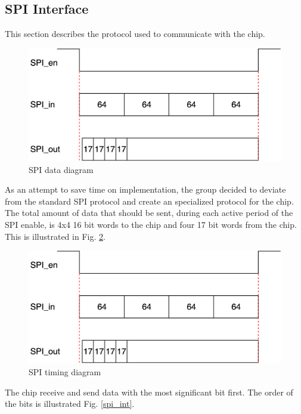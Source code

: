 
 \newpage
\subsection{SPI Interface}
This section describes the protocol used to communicate with the chip.

\begin{figure}[H]
\centering
\captionsetup{justification=centering}
\includegraphics[scale=0.35]{../figures/spi_data.png}
\caption{SPI data diagram}
\label{data}
\end{figure}

As an attempt to save time on implementation, the group decided to deviate from the standard SPI protocol and create an specialized protocol for the chip.\\
The total amount of data that should be sent, during each active period of the SPI enable, is 4x4 16 bit words to the chip and four 17 bit words from the chip. This is illustrated in Fig. \ref{spi_data}.

\begin{figure}[H]
\centering
\captionsetup{justification=centering}
\includegraphics[scale=0.35]{../figures/spi_data.png}
\caption{SPI timing diagram}
\label{spi_data}
\end{figure}

The chip receive and send data with the most significant bit first. The order of the bits is illustrated Fig. \ref{spi_int}. \\

